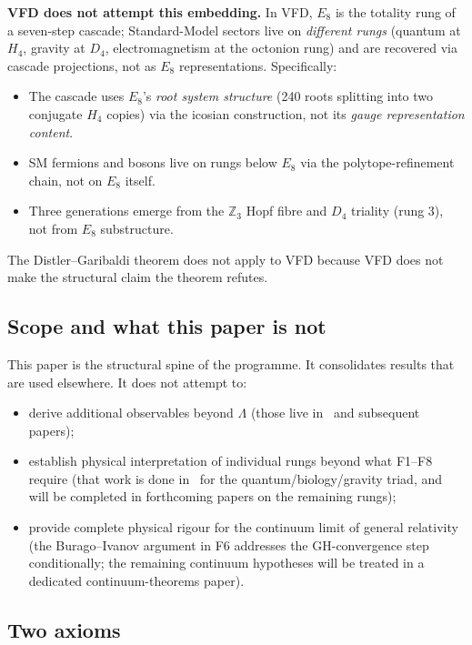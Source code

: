 \documentclass[12pt]{article}
\theoremstyle{definition}
\theoremstyle{remark}
\begin{document}
\textbf{VFD does not attempt this embedding.} In VFD, $E_8$ is the totality rung of a seven-step cascade; Standard-Model sectors live on \emph{different rungs} (quantum at $H_4$, gravity at $D_4$, electromagnetism at the octonion rung) and are recovered via cascade projections, not as $E_8$ representations. Specifically:
\begin{itemize}
\item The cascade uses $E_8$'s \emph{root system structure} (240 roots splitting into two conjugate $H_4$ copies) via the icosian construction, not its \emph{gauge representation content}.
\item SM fermions and bosons live on rungs below $E_8$ via the polytope-refinement chain, not on $E_8$ itself.
\item Three generations emerge from the $\mathbb{Z}_3$ Hopf fibre and $D_4$ triality (rung 3), not from $E_8$ substructure.
\end{itemize}
The Distler--Garibaldi theorem does not apply to VFD because VFD does not make the structural claim the theorem refutes.

\subsection{Scope and what this paper is not}

This paper is the structural spine of the programme. It consolidates results that are used elsewhere. It does not attempt to:
\begin{itemize}
\item derive additional observables beyond $\Lambda$ (those live in~\citep{SmartV,SmartXXII,SmartXXXII} and subsequent papers);
\item establish physical interpretation of individual rungs beyond what F1--F8 require (that work is done in~\citep{SmartXXXV} for the quantum/biology/gravity triad, and will be completed in forthcoming papers on the remaining rungs);
\item provide complete physical rigour for the continuum limit of general relativity (the Burago--Ivanov argument in F6 addresses the GH-convergence step conditionally; the remaining continuum hypotheses will be treated in a dedicated continuum-theorems paper).
\end{itemize}

\subsection{Two axioms}\label{sec:axioms}
\end{document}
